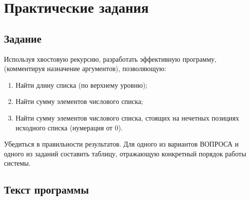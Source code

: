 \chapter{Практические задания}

\section{Задание}

Используя хвостовую рекурсию, разработать эффективную программу, (комментируя
назначение аргументов), позволяющую:

\begin{enumerate}[label=\arabic*)]
    \item Найти длину списка (по верхнему уровню);
    \item Найти сумму элементов числового списка;
    \item Найти сумму элементов числового списка, стоящих на нечетных позициях
        исходного списка (нумерация от 0).
\end{enumerate}

Убедиться в правильности результатов.
Для одного из вариантов ВОПРОСА и одного из заданий составить таблицу,
отражающую конкретный порядок работы системы.

\clearpage
\section{Текст программы}


